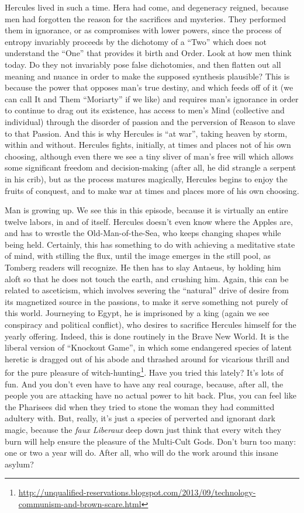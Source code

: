 Hercules lived in such a time. Hera had come, and degeneracy reigned, because men had forgotten the reason for the sacrifices and mysteries. They performed them in ignorance, or as compromises with lower powers, since the process of entropy invariably proceeds by the dichotomy of a ``Two'' which does not understand the ``One'' that provides it birth and Order. Look at how men think today. Do they not invariably pose false dichotomies, and then flatten out all meaning and nuance in order to make the supposed synthesis plausible? This is because the power that opposes man's true destiny, and which feeds off of it (we can call It and Them ``Moriarty'' if we like) and requires man's ignorance in order to continue to drag out its existence, has access to men's Mind (collective and individual) through the disorder of passion and the perversion of Reason to slave to that Passion. And this is why Hercules is ``at war'', taking heaven by storm, within and without. Hercules fights, initially, at times and places not of his own choosing, although even there we see a tiny sliver of man's free will which allows some significant freedom and decision-making (after all, he did strangle a serpent in his crib), but as the process matures magically, Hercules begins to enjoy the fruits of conquest, and to make war at times and places more of his own choosing.

Man is growing up. We see this in this episode, because it is virtually an entire twelve labors, in and of itself. Hercules doesn't even know where the Apples are, and has to wrestle the Old-Man-of-the-Sea, who keeps changing shapes while being held. Certainly, this has something to do with achieving a meditative state of mind, with stilling the flux, until the image emerges in the still pool, as Tomberg readers will recognize. He then has to slay Antaeus, by holding him aloft so that he does not touch the earth, and crushing him. Again, this can be related to asceticism, which involves severing the ``natural'' drive of desire from its magnetized source in the passions, to make it serve something not purely of this world. Journeying to Egypt, he is imprisoned by a king (again we see conspiracy and political conflict), who desires to sacrifice Hercules himself for the yearly offering. Indeed, this is done routinely in the Brave New World. It is the liberal version of ``Knockout Game'', in which some endangered species of latent heretic is dragged out of his abode and thrashed around for vicarious thrill and for the pure pleasure of witch-hunting\footnote{\url{http://unqualified-reservations.blogspot.com/2013/09/technology-communism-and-brown-scare.html}}. Have you tried this lately? It's lots of fun. And you don't even have to have any real courage, because, after all, the people you are attacking have no actual power to hit back. Plus, you can feel like the Pharisees did when they tried to stone the woman they had committed adultery with. But, really, it's just a species of perverted and ignorant dark magic, because the \emph{faux Liberaux} deep down just think that every witch they burn will help ensure the pleasure of the Multi-Cult Gods. Don't burn too many: one or two a year will do. After all, who will do the work around this insane asylum?


